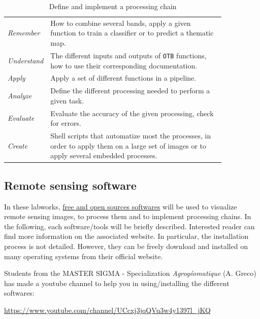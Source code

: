 \documentclass[a4paper,11pt,DIV=18]{scrartcl}
\begin{document}
\begin{table}[htbp]
\caption{\label{tab:org8b0a75f}
Define and implement a processing chain}
\centering
\begin{tabular}{lp{0.85\linewidth}}
\toprule
\emph{Remember} & How to  combine several bands, apply a given  function to train  a classifier or to predict a thematic map.\\
\emph{Understand} & The different  inputs and outputs of  \texttt{OTB} functions, how  to use their corresponding documentation.\\
\emph{Apply} & Apply a set of different functions in a pipeline.\\
\emph{Analyze} & Define the different processing needed to perform a given task.\\
\emph{Evaluate} & Evaluate the accuracy of the given processing, check for errors.\\
\emph{Create} & Shell scripts that automatize most the processes, in order to  apply them  on a large set of images  or to apply  several embedded  processes.\\
\bottomrule
\end{tabular}
\end{table}

\subsection{Remote sensing software}
\label{sec:orgf1c26ea}
In these  labworks, \href{https://www.fsf.org/}{free and  open sources  softwares} will be  used to
visualize  remote sensing  images, to  process them  and to  implement
processing  chains.  In  the  following, each  software/tools will  be
briefly described.  Interested reader can find more information on the
associated website.   In particular,  the installation process  is not
detailed. However, they  can be freely download and  installed on many
operating systems from their official website.

Students  from  the  MASTER   SIGMA  -  Specialization  \emph{Agrogéomatique}
(A. Greco) has made a youtube  channel to help you in using/installing
the                        different                        softwares:
\begin{center}
\url{https://www.youtube.com/channel/UCcxj3jqQVu3w4y1397l\_jKQ}
\end{center}
\end{document}
